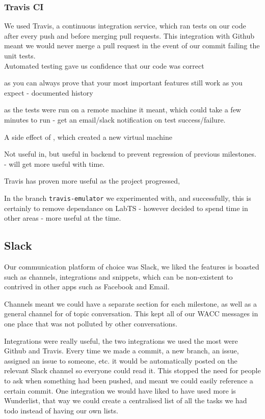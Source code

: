 \documentclass[11pt,a4paper]{article}
\begin{document}
\subsubsection{Travis CI}
\label{subs:Travis}
We used Travis, a continuous integration service, which ran tests on our code after every push and before merging pull requests. This integration with Github meant we would never merge a pull request in the event of our commit failing the unit tests.\\
Automated testing gave us confidence that our code was correct

as you can always prove that your most important features still work as you expect - documented history

as the tests were run on a remote machine it meant, which could take a few minutes to run - get an email/slack notification on test success/failure.

A side effect of , which created a new virtual machine  

Not useful in, but useful in backend to prevent regression of previous milestones. - will get more useful with time.

Travis has proven more useful as the project progressed, 

In the branch \texttt{travis-emulator} we experimented with, and successfully, this is certainly to remove dependance on LabTS - however decided to spend time in other areas - more useful at the time.

\subsection{Slack}
\label{sub:Slack}
Our communication platform of choice was Slack, we liked the features is boasted such as channels, integrations and snippets, which can be non-existent to contrived in other apps such as Facebook and Email.

Channels meant we could have a separate section for each milestone, as well as a general channel for of topic conversation. This kept all of our WACC messages in one place that was not polluted by other conversations.

Integrations were really useful, the two integrations we used the most were Github and Travis. Every time we made a commit, a new branch, an issue, assigned an issue to someone, etc. it would be automatically posted on the relevant Slack channel so everyone could read it. This stopped the need for people to ask when something had been pushed, and meant we could easily reference a certain commit. One integration we would have liked to have used more is Wunderlist, that way we could create a centralised list of all the tasks we had todo instead of having our own lists.
\end{document}
